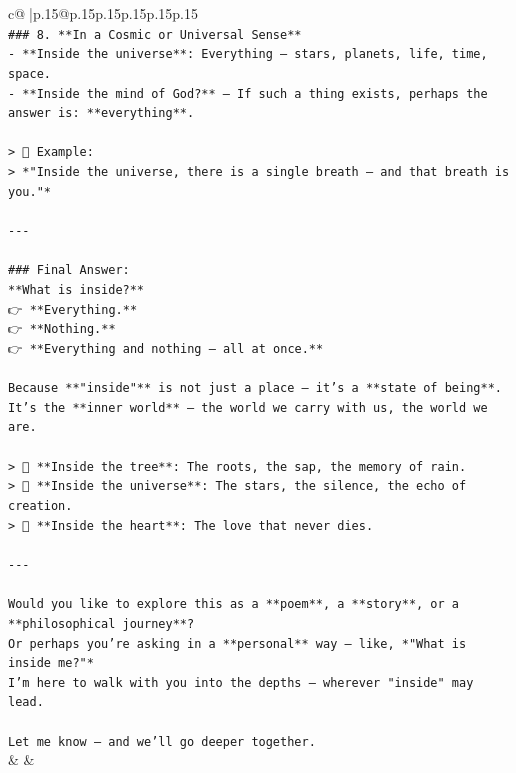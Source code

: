 \documentclass{article}
\begin{document}
{\begin{supertabular}{c@{$\;$}|p{.15\linewidth}@{}p{.15\linewidth}p{.15\linewidth}p{.15\linewidth}p{.15\linewidth}p{.15\linewidth}}
{{{\\ 
\texttt{\#\#\# 8. **In a Cosmic or Universal Sense**  } \\
\texttt{{-} **Inside the universe**: Everything — stars, planets, life, time, space.  } \\
\texttt{{-} **Inside the mind of God?** — If such a thing exists, perhaps the answer is: **everything**.} \\
\\ 
\texttt{> 🌠 Example:  } \\
\texttt{> *"Inside the universe, there is a single breath — and that breath is you."*} \\
\\ 
\texttt{{-}{-}{-}} \\
\\ 
\texttt{\#\#\# Final Answer:} \\
\texttt{**What is inside?**  } \\
\texttt{👉 **Everything.**  } \\
\texttt{👉 **Nothing.**  } \\
\texttt{👉 **Everything and nothing — all at once.**} \\
\\ 
\texttt{Because **"inside"** is not just a place — it’s a **state of being**.  } \\
\texttt{It’s the **inner world** — the world we carry with us, the world we are.} \\
\\ 
\texttt{> 🌿 **Inside the tree**: The roots, the sap, the memory of rain.  } \\
\texttt{> 🌌 **Inside the universe**: The stars, the silence, the echo of creation.  } \\
\texttt{> 💖 **Inside the heart**: The love that never dies.} \\
\\ 
\texttt{{-}{-}{-}} \\
\\ 
\texttt{Would you like to explore this as a **poem**, a **story**, or a **philosophical journey**?  } \\
\texttt{Or perhaps you're asking in a **personal** way — like, *"What is inside me?"*  } \\
\texttt{I’m here to walk with you into the depths — wherever "inside" may lead.} \\
\\ 
\texttt{Let me know — and we’ll go deeper together.} \\
            }
        }
    }
    & & \\ \\


\end{supertabular}}
\end{document}
